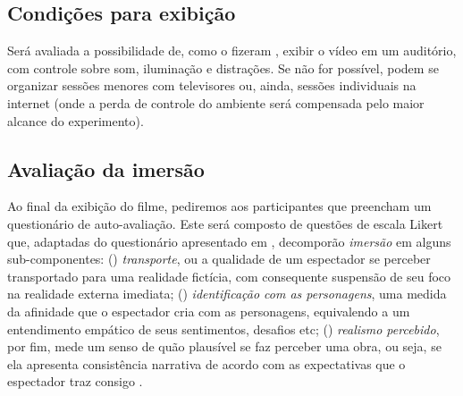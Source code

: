 \documentclass[a4paper,11pt,titlepage,singlespacing]{article}
\begin{document}
\subsection*{Condições para exibição}

Será avaliada a possibilidade de, como o fizeram , exibir o vídeo em um auditório, com controle sobre som, iluminação e distrações. Se não for possível, podem se organizar sessões menores com televisores ou, ainda, sessões individuais na internet (onde a perda de controle do ambiente será compensada pelo maior alcance do experimento).

\subsection*{Avaliação da imersão}

Ao final da exibição do filme, pediremos aos participantes que preencham um questionário de auto-avaliação. Este será composto de questões de escala Likert que, adaptadas do questionário apresentado em , decomporão \textit{imersão} em alguns sub-componentes: () \textit{transporte}, ou a qualidade de um espectador se perceber transportado para uma realidade fictícia, com consequente suspensão de seu foco na realidade externa imediata; () \textit{identificação com as personagens}, uma medida da afinidade que o espectador cria com as personagens, equivalendo a um entendimento empático de seus sentimentos, desafios etc; () \textit{realismo percebido}, por fim, mede um senso de quão plausível se faz perceber uma obra, ou seja, se ela apresenta consistência narrativa de acordo com as expectativas que o espectador traz consigo \cite{transatology}.






    
\end{document}

